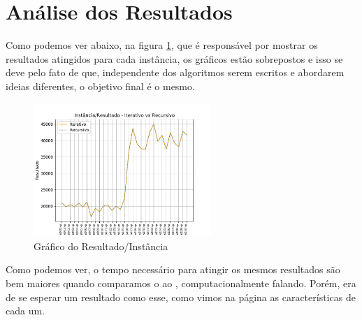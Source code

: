 \documentclass[a4paper, 12pt]{article}
\begin{document}
\section{Análise dos Resultados}
Como podemos ver abaixo, na figura \ref{fig:result_two}, que é responsável por mostrar os resultados atingidos
para cada instância, os gráficos estão sobrepostos e isso se deve pelo fato de que, independente dos algoritmos
serem escritos e abordarem ideias diferentes, o objetivo final é o mesmo.
\begin{figure}[!h]
    \centering
    \includegraphics[width=0.6\textwidth]{../img/result_two.pdf}
    \caption{Gráfico do Resultado/Instância}
    \label{fig:result_two}
\end{figure}

Como podemos ver, o tempo necessário para atingir os mesmos resultados são bem maiores quando
comparamos o  ao , computacionalmente falando. Porém, era de
se esperar um resultado como esse, como vimos na página \pageref{sec:introducao} as características de cada um.
\end{document}
